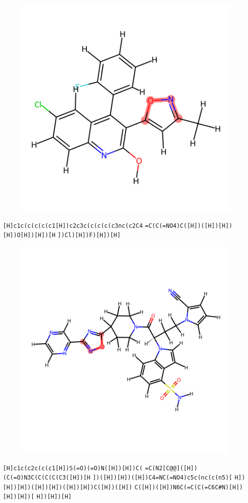 \documentclass{article}
\begin{document}
\begin{figure}[ht]
\centering
    \includegraphics{mol286.png}
\end{figure}
\verb|[H]c1c(c(c(c(c1[H])c2c3c(c(c(c(c3nc(c2C4| \verb|=C(C(=NO4)C([H])([H])[H])[H])O[H])[H])[H| \verb|])Cl)[H])F)[H])[H]|

\begin{figure}[ht]
\centering
    \includegraphics{mol287.png}
\end{figure}
\verb|[H]c1c(c2c(c(c1[H])S(=O)(=O)N([H])[H])C(| \verb|=C(N2[C@@]([H])(C(=O)N3C(C(C(C(C3([H])[H| \verb|])([H])[H])([H])C4=NC(=NO4)c5c(nc(c(n5)[| \verb|H])[H])[H])([H])[H])([H])[H])C([H])([H])| \verb|C([H])([H])N6C(=C(C(=C6C#N)[H])[H])[H])[| \verb|H])[H])[H]|
\end{document}
